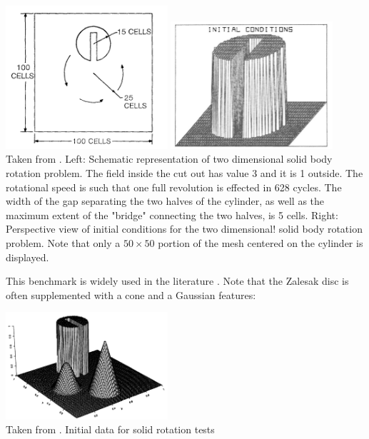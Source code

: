 \begin{center}
\includegraphics[width=6cm]{images/tracking/zale79a}
\includegraphics[width=6cm]{images/tracking/zale79b}\\
{\tiny Taken from \cite{zale79}. Left: Schematic representation of two dimensional 
solid body rotation problem. The field inside the cut out has value 3 and it is 1
outside. The rotational speed is such that one full revolution is effected in 
628 cycles. The width of the gap separating the two halves of the cylinder,
as well as the maximum extent of the "bridge" connecting the two halves, is 5 cells.
Right: Perspective view of initial conditions for the two dimensional! solid body rotation
problem. Note that only a $50\times50$ portion of the mesh centered on the cylinder is displayed.}
\end{center}

This benchmark is widely used in the literature \cite{stco91,supu00,vasv05,dilp06,basd08,zhbl14}.
Note that the Zalesak disc is often supplemented with a cone and a Gaussian features:

\begin{center}
\includegraphics[width=6cm]{images/tracking/leve96}\\
{\tiny Taken from \cite{leve96}. Initial data for solid rotation tests}
\end{center}

